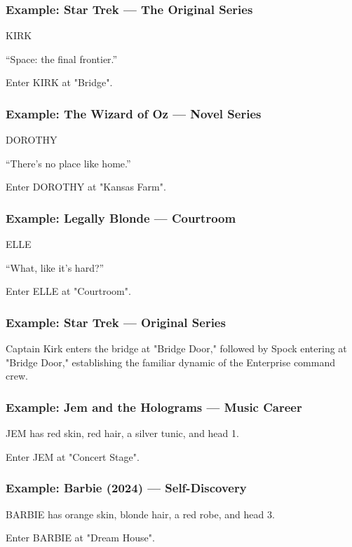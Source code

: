 \documentclass[11pt,letterpaper,oldstylefigures]{memoir}
\newcommand{\speaker}[1]{\nobreak\hspace*{0.333\textwidth}\MakeUppercase{#1}\par\nobreak\vspace{0.5\baselineskip}}
\newcommand{\dialogue}[1]{\nobreak\hspace*{0.25\textwidth}\begin{minipage}{0.5\textwidth}#1\end{minipage}\par\vspace{1\baselineskip}}
\newcommand{\stagedir}[1]{#1\par\vspace{1\baselineskip}}
\newenvironment{FountainExample}
  {\begingroup
  \ttfamily\small
   \setlength{\parindent}{0pt}
  \setlength{\parskip}{0.5em}
  \allowdisplaybreaks
  \setlength{\displaywidowpenalty}{0}
  \setlength{\widowpenalty}{0}
  \setlength{\clubpenalty}{0}
  \setlength{\interlinepenalty}{0}
}
  {\endgroup}
\begin{document}
\subsubsection{Example: Star Trek — The Original Series}
\begin{FountainExample}
\speaker{KIRK}
\dialogue{“Space: the final frontier.”}
\stagedir{Enter KIRK at "Bridge".}
\end{FountainExample}

\subsubsection{Example: The Wizard of Oz — Novel Series}
\begin{FountainExample}
\speaker{DOROTHY}
\dialogue{“There's no place like home.”}
\stagedir{Enter DOROTHY at "Kansas Farm".}
\end{FountainExample}

\subsubsection{Example: Legally Blonde — Courtroom}
\begin{FountainExample}
\speaker{ELLE}
\dialogue{“What, like it's hard?”}
\stagedir{Enter ELLE at "Courtroom".}
\end{FountainExample}

\subsubsection{Example: Star Trek — Original Series}
\begin{FountainExample}
\stagedir{Captain Kirk enters the bridge at "Bridge Door," followed by Spock entering at "Bridge Door," establishing the familiar dynamic of the Enterprise command crew.}
\end{FountainExample}

\subsubsection{Example: Jem and the Holograms — Music Career}
\begin{FountainExample}
\stagedir{JEM has red skin, red hair, a silver tunic, and head 1.}
\stagedir{Enter JEM at "Concert Stage".}
\end{FountainExample}

\subsubsection{Example: Barbie (2024) — Self-Discovery}
\begin{FountainExample}
\stagedir{BARBIE has orange skin, blonde hair, a red robe, and head 3.}
\stagedir{Enter BARBIE at "Dream House".}
\end{FountainExample}
\end{document}
